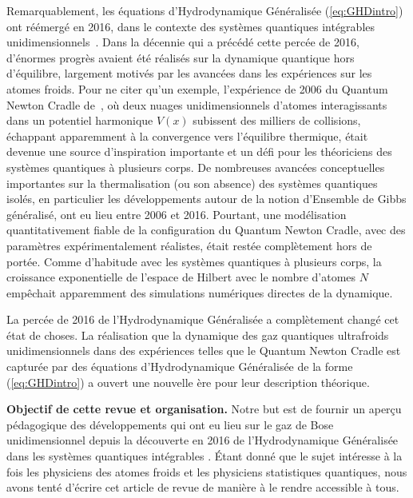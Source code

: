 Remarquablement, les équations d'Hydrodynamique Généralisée (\ref{eq:GHDintro}) ont réémergé en 2016, dans le contexte des systèmes quantiques intégrables unidimensionnels~\citep{castro2016emergent,bertini2016transport}. Dans la décennie qui a précédé cette percée de 2016, d'énormes progrès avaient été réalisés sur la dynamique quantique hors d'équilibre, largement motivés par les avancées dans les expériences sur les atomes froids. Pour ne citer qu'un exemple, l'expérience de 2006 du Quantum Newton Cradle de~\cite{kinoshita2006quantum}, où deux nuages unidimensionnels d'atomes interagissants dans un potentiel harmonique \(V(x)\) subissent des milliers de collisions, échappant apparemment à la convergence vers l'équilibre thermique, était devenue une source d'inspiration importante et un défi pour les théoriciens des systèmes quantiques à plusieurs corps. De nombreuses avancées conceptuelles importantes sur la thermalisation (ou son absence) des systèmes quantiques isolés, en particulier les développements autour de la notion d'Ensemble de Gibbs généralisé, ont eu lieu entre 2006 et 2016. Pourtant, une modélisation quantitativement fiable de la configuration du Quantum Newton Cradle, avec des paramètres expérimentalement réalistes, était restée complètement hors de portée. Comme d'habitude avec les systèmes quantiques à plusieurs corps, la croissance exponentielle de l'espace de Hilbert avec le nombre d'atomes \(N\) empêchait apparemment des simulations numériques directes de la dynamique.

La percée de 2016 de l'Hydrodynamique Généralisée a complètement changé cet état de choses. La réalisation que la dynamique des gaz quantiques ultrafroids unidimensionnels dans des expériences telles que le Quantum Newton Cradle est capturée par des équations d'Hydrodynamique Généralisée de la forme (\ref{eq:GHDintro}) a ouvert une nouvelle ère pour leur description théorique.

\vspace{1cm}

{\bf Objectif de cette revue et organisation.} Notre but est de 
fournir un aperçu pédagogique des développements qui ont eu lieu sur le gaz de Bose unidimensionnel depuis la découverte en 2016 de l'Hydrodynamique Généralisée dans les systèmes quantiques intégrables \citep{castro2016emergent,bertini2016transport}. Étant donné que le sujet intéresse à la fois les physiciens des atomes froids et les physiciens statistiques quantiques, nous avons tenté d'écrire cet article de revue de manière à le rendre accessible à tous.

